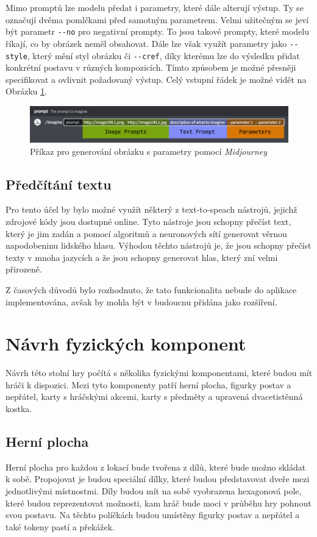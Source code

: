 Mimo promptů lze modelu předat i parametry, které dále alterují výstup. Ty se označují dvěma pomlčkami před samotným parametrem. Velmi užitečným se jeví být parametr \texttt{{-}{-}no} pro negativní prompty. To jsou takové prompty, které modelu říkají, co by obrázek neměl obsahovat. Dále lze však využít parametry jako \texttt{{-}{-}style}, který mění styl obrázku či \texttt{{-}{-}cref}, díky kterému lze do výsledku přidat konkrétní postavu v různých kompozicích. Tímto způsobem je možné přesněji specifikovat a ovlivnit požadovaný výstup. Celý vstupní řádek je možné vidět na Obrázku \ref{fig:mj_prompts_params}.

\begin{figure}[H]
    \centering
    \includegraphics[width=1\textwidth]{resources/figures/midjourney_prompts_params.png}
    \caption{Příkaz pro generování obrázku s parametry pomocí \textit{Midjourney} \cite{midjourney}}
    \label{fig:mj_prompts_params}
\end{figure}

\subsection{Předčítání textu}
Pro tento účel by bylo možné využít některý z text-to-speach nástrojů, jejichž zdrojové kódy jsou dostupné online. Tyto nástroje jsou schopny přečíst text, který je jim zadán a pomocí algoritmů a neuronových sítí generovat věrnou napodobeninu lidského hlasu. Výhodou těchto nástrojů je, že jsou schopny přečíst texty v mnoha jazycích a že jsou schopny generovat hlas, který zní velmi přirozeně.

Z časových důvodů bylo rozhodnuto, že tato funkcionalita nebude do aplikace implementována, avšak by mohla být v budoucnu přidána jako rozšíření.

\section{Návrh fyzických komponent}
Návrh této stolní hry počítá s několika fyzickými komponentami, které budou mít hráči k dispozici. Mezi tyto komponenty patří herní plocha, figurky postav a nepřátel, karty s hráčskými akcemi, karty s předměty a upravená dvacetistěnná kostka.

\subsection{Herní plocha}
Herní plocha pro každou z lokací bude tvořena z dílů, které bude možno skládat k sobě. Propojovat je budou speciální dílky, které budou představovat dveře mezi jednotlivými místnostmi. Díly budou mít na sobě vyobrazena hexagonová pole, které budou reprezentovat možnosti, kam hráč bude moci v průběhu hry pohnout svou postavu. Na těchto políčkách budou umístěny figurky postav a nepřátel a také tokeny pastí a překážek.

